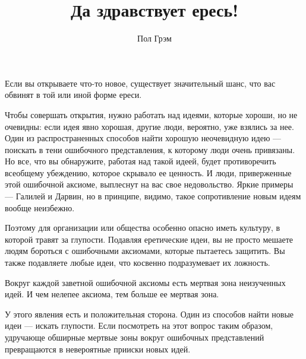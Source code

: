 \documentclass[ebook,12pt,oneside,openany]{memoir}
\title{Да здравствует ересь!} \author{Пол Грэм} \date{}
\begin{document}
\maketitle

Если вы открываете что-то новое, существует значительный шанс, что вас
обвинят в той или иной форме ереси. \newline 

Чтобы совершать открытия, нужно работать над идеями, которые хороши,
но не очевидны: если идея явно хорошая, другие люди, вероятно, уже
взялись за нее. Один из распространенных способов найти хорошую
неочевидную идею — поискать в тени ошибочного представления, к
которому люди очень привязаны. Но все, что вы обнаружите, работая над
такой идеей, будет противоречить всеобщему убеждению, которое скрывало
ее ценность. И люди, приверженные этой ошибочной аксиоме, выплеснут на
вас свое недовольство. Яркие примеры — Галилей и Дарвин, но в
принципе, видимо, такое сопротивление новым идеям вообще неизбежно. \newline

Поэтому для организации или общества особенно опасно иметь культуру, в
которой травят за глупости. Подавляя еретические идеи, вы не просто
мешаете людям бороться с ошибочными аксиомами, которые пытаетесь
защитить. Вы также подавляете любые идеи, что косвенно подразумевает
их ложность. \newline

Вокруг каждой заветной ошибочной аксиомы есть мертвая зона неизученных
идей. И чем нелепее аксиома, тем больше ее мертвая зона. \newline

У этого явления есть и положительная сторона. Один из способов найти
новые идеи — искать глупости. Если посмотреть на этот вопрос таким
образом, удручающе обширные мертвые зоны вокруг ошибочных
представлений превращаются в невероятные прииски новых идей. 
\end{document}
